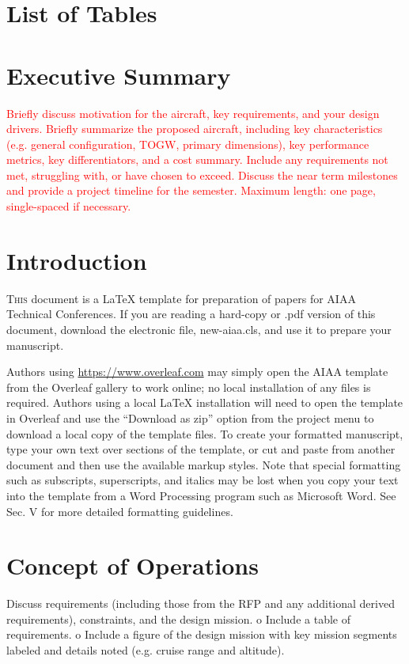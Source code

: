 \documentclass[conf]{new-aiaa}
\begin{document}
\section{List of Tables}

\section{Executive Summary}
\textcolor{red}{Briefly discuss motivation for the aircraft, key requirements, and your design drivers.  Briefly  summarize the proposed aircraft, including key  characteristics (e.g. general configuration, TOGW, primary dimensions), key performance metrics, key differentiators, and a cost summary.  Include any requirements not met, struggling with, or have chosen to exceed.  Discuss the near term milestones and provide a project timeline for the semester.  Maximum length: one page, single-spaced if necessary.}

\section{Introduction}
\lettrine{T}{his} document is a \LaTeX{} template for preparation of papers for AIAA Technical Conferences. If you are reading a hard-copy or .pdf version of this document, download the electronic file, new-aiaa.cls, and use it to prepare your manuscript.

Authors using \url{https://www.overleaf.com} may simply open the AIAA template from the Overleaf gallery to work online; no local installation of any files is required. Authors using a local \LaTeX{} installation will need to open the template in Overleaf and use the ``Download as zip'' option from the project menu to download a local copy of the template files. To create your formatted manuscript, type your own text over sections of the template, or cut and paste from another document and then use the available markup styles. Note that special formatting such as subscripts, superscripts, and italics may be lost when you copy your text into the template from a Word Processing program such as Microsoft Word. See Sec. V for more detailed formatting guidelines.

\section{Concept of Operations}

Discuss requirements (including those from the RFP and any additional derived
requirements), constraints, and the design mission.
o Include a table of requirements.
o Include a figure of the design mission with key mission segments labeled
and details noted (e.g. cruise range and altitude).
\end{document}
